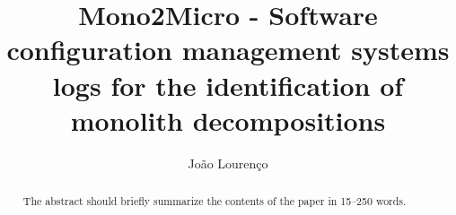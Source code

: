 \documentclass[runningheads]{llncs}
\begin{document}
%
\title{Mono2Micro - Software configuration management systems logs for the identification of monolith decompositions}
%
%
\author{João Lourenço}
%

%
\maketitle
%
\begin{abstract}
The abstract should briefly summarize the contents of the paper in
15--250 words.

\end{abstract}
%
%
%
\tableofcontents











\end{document}
